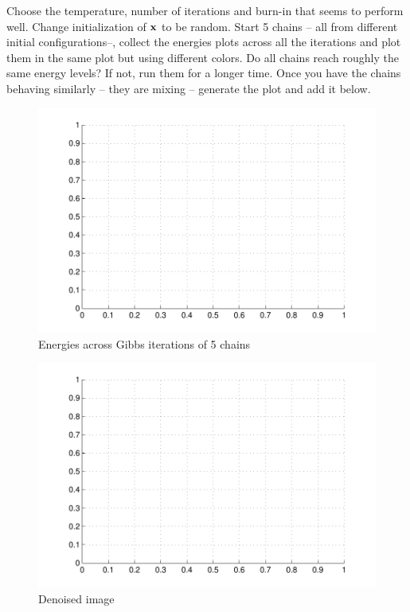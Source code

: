 \documentclass{article}
\begin{document}
\newproblem{2pt} Choose the temperature, number of iterations and burn-in that seems to perform well.
Change initialization of $\mathbf{x}$ to be random.
Start 5 chains -- all from different initial configurations--, collect the energies plots across all the iterations and plot them in the same plot but
using different colors.
Do all chains reach roughly the same energy levels? If not, run them for a longer time.
Once you have the chains behaving similarly -- they are mixing -- generate the plot and add it below.
\begin{figure}
\begin{center}
\includegraphics{emptiness.pdf}
\caption{Energies across Gibbs iterations of 5 chains}
\end{center}
\end{figure}


\begin{figure}
\begin{center}
\includegraphics{emptiness.pdf}
\end{center}
\caption{Denoised image}
\end{figure}
\end{document}
